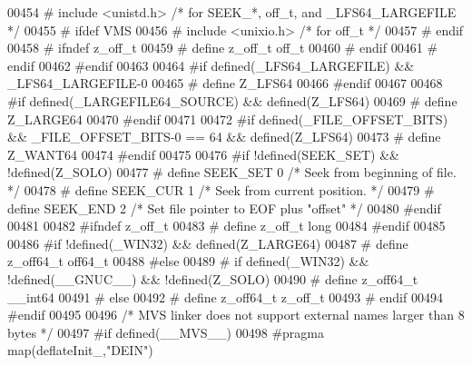 \begin{DoxyCode}
00454 \textcolor{preprocessor}{#    include <unistd.h>}         \textcolor{comment}{/* for SEEK\_*, off\_t, and \_LFS64\_LARGEFILE */}
00455 \textcolor{preprocessor}{#    ifdef VMS}
00456 \textcolor{preprocessor}{#      include <unixio.h>}       \textcolor{comment}{/* for off\_t */}
00457 \textcolor{preprocessor}{#    endif}
00458 \textcolor{preprocessor}{#    ifndef z\_off\_t}
00459 \textcolor{preprocessor}{#      define z\_off\_t off\_t}
00460 \textcolor{preprocessor}{#    endif}
00461 \textcolor{preprocessor}{#  endif}
00462 \textcolor{preprocessor}{#endif}
00463 
00464 \textcolor{preprocessor}{#if defined(\_LFS64\_LARGEFILE) && \_LFS64\_LARGEFILE-0}
00465 \textcolor{preprocessor}{#  define Z\_LFS64}
00466 \textcolor{preprocessor}{#endif}
00467 
00468 \textcolor{preprocessor}{#if defined(\_LARGEFILE64\_SOURCE) && defined(Z\_LFS64)}
00469 \textcolor{preprocessor}{#  define Z\_LARGE64}
00470 \textcolor{preprocessor}{#endif}
00471 
00472 \textcolor{preprocessor}{#if defined(\_FILE\_OFFSET\_BITS) && \_FILE\_OFFSET\_BITS-0 == 64 && defined(Z\_LFS64)}
00473 \textcolor{preprocessor}{#  define Z\_WANT64}
00474 \textcolor{preprocessor}{#endif}
00475 
00476 \textcolor{preprocessor}{#if !defined(SEEK\_SET) && !defined(Z\_SOLO)}
00477 \textcolor{preprocessor}{#  define SEEK\_SET        0       }\textcolor{comment}{/* Seek from beginning of file.  */}\textcolor{preprocessor}{}
00478 \textcolor{preprocessor}{#  define SEEK\_CUR        1       }\textcolor{comment}{/* Seek from current position.  */}\textcolor{preprocessor}{}
00479 \textcolor{preprocessor}{#  define SEEK\_END        2       }\textcolor{comment}{/* Set file pointer to EOF plus "offset" */}\textcolor{preprocessor}{}
00480 \textcolor{preprocessor}{#endif}
00481 
00482 \textcolor{preprocessor}{#ifndef z\_off\_t}
00483 \textcolor{preprocessor}{#  define z\_off\_t long}
00484 \textcolor{preprocessor}{#endif}
00485 
00486 \textcolor{preprocessor}{#if !defined(\_WIN32) && defined(Z\_LARGE64)}
00487 \textcolor{preprocessor}{#  define z\_off64\_t off64\_t}
00488 \textcolor{preprocessor}{#else}
00489 \textcolor{preprocessor}{#  if defined(\_WIN32) && !defined(\_\_GNUC\_\_) && !defined(Z\_SOLO)}
00490 \textcolor{preprocessor}{#    define z\_off64\_t \_\_int64}
00491 \textcolor{preprocessor}{#  else}
00492 \textcolor{preprocessor}{#    define z\_off64\_t z\_off\_t}
00493 \textcolor{preprocessor}{#  endif}
00494 \textcolor{preprocessor}{#endif}
00495 
00496 \textcolor{comment}{/* MVS linker does not support external names larger than 8 bytes */}
00497 \textcolor{preprocessor}{#if defined(\_\_MVS\_\_)}
00498 \textcolor{preprocessor}{  #pragma map(deflateInit\_,"DEIN")}

\end{DoxyCode}
